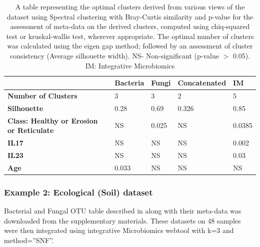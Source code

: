 \begin{table}[H]
	\begin{tabular}{|l|l|l|l|l|}
		\hline
		& \textbf{Bacteria} & \textbf{Fungi} & \textbf{Concatenated} & \textbf{IM} \\ \hline
		\textbf{Number of Clusters}                      & 3                 & 3              & 2                     & 5                                 \\ \hline
		\textbf{Silhouette}                              & 0.28              & 0.69           & 0.326                 & 0.85                              \\ \hline
		\textbf{Class: Healthy or Erosion or Reticulate} & NS                & 0.025          & NS                    & 0.0385                            \\ \hline
		\textbf{IL17}                                    & NS                & NS             & NS                    & 0.002                             \\ \hline
		\textbf{IL23}                                    & NS                & NS             & NS                    & 0.03                              \\ \hline
		\textbf{Age}                                     & 0.033             & NS             & NS                    & NS                                \\ \hline
	\end{tabular}
	\caption{A table representing the optimal clusters derived from various views of the dataset using Spectral clustering with Bray-Curtis similarity and p-value for the assessment of meta-data on the derived clusters, computed using chiq-squared test or kruskal-wallis test, wherever appropriate. The optimal number of clusters was calculated using the eigen gap method; followed by an assessment of cluster consistency (Average silhouette width).  NS- Non-significant (p-value $>$ 0.05). IM: Integrative Microbiomics}
	\label{tab1}
\end{table}

\subsubsection{Example 2: Ecological (Soil) dataset}
Bacterial and Fungal OTU table described in \cite{Wagg2019} along with their meta-data was downloaded from the supplementary materials. These datasets on 48 samples were then integrated using integrative Microbiomics webtool with k=3 and method=”SNF”.\\

